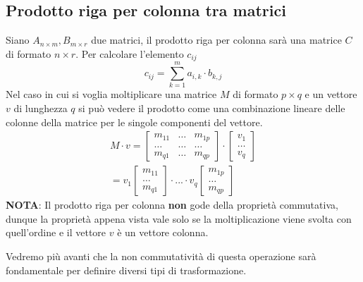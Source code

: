 \subsection{Prodotto riga per colonna tra matrici}
Siano $A_{n \times m}, B_{m \times r}$ due matrici, il prodotto riga per colonna
sar\`a una matrice $C$ di formato $n \times r$. Per calcolare l'elemento $c_{ij}$
\[ c_{ij} = \sum_{k = 1}^m a_{i,k} \cdot b_{k,j} \]
Nel caso in cui si voglia moltiplicare una matrice $M$ di formato $p \times q$ e un
vettore $v$ di lunghezza $q$ si pu\`o vedere il prodotto come una combinazione lineare
delle colonne della matrice per le singole componenti del vettore.
\begin{gather*}
	M \cdot v =
	\begin{bmatrix}
		m_{11} & \dots & m_{1p} \\
		\dots  & \dots & \dots  \\
		m_{q1} & \dots & m_{qp}
	\end{bmatrix} \cdot
	\begin{bmatrix}
		v_1 \\ \dots \\ v_q
	\end{bmatrix} \\
	= v_1 \begin{bmatrix}
		m_{11} \\ \dots \\ m_{q1}
	\end{bmatrix} \cdot
	... \cdot
	v_q \begin{bmatrix}
		m_{1p} \\ \dots \\ m_{qp}
	\end{bmatrix}
\end{gather*}
\textbf{NOTA}: Il prodotto riga per colonna \textbf{non} gode della propriet\`a
commutativa, dunque la propriet\`a appena vista vale solo se la moltiplicazione viene
svolta con quell'ordine e il vettore $v$ \`e un vettore colonna.

Vedremo pi\`u avanti che la non commutativit\`a di questa operazione sar\`a fondamentale
per definire diversi tipi di trasformazione.